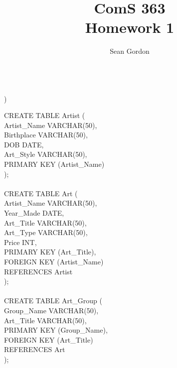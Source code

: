 \documentclass[12pt]{article}
\title{ComS 363\\Homework 1}
\author{Sean Gordon}
\newenvironment{PTMono}{\fontfamily{PTMono-TLF}\selectfont}{\par}
\begin{document}
\maketitle


\hrulefill \\



)

\begin{multicols}{2}
\begin{PTMono} \footnotesize

\noindent CREATE TABLE Artist (\\
\indent Artist\_Name VARCHAR(50),\\
\indent   Birthplace VARCHAR(50),\\
\indent   DOB DATE,\\
\indent   Art\_Style VARCHAR(50),\\
  
 PRIMARY KEY (Artist\_Name)\\
);\\\\



\noindent CREATE TABLE Art (\\
\indent   Artist\_Name VARCHAR(50),\\
\indent   Year\_Made DATE,\\
\indent   Art\_Title VARCHAR(50),\\
\indent   Art\_Type VARCHAR(50),\\
\indent   Price INT,\\
  
 PRIMARY KEY (Art\_Title),\\
\indent   FOREIGN KEY (Artist\_Name) \\
\indent \indent  REFERENCES Artist\\
);\\\\



\noindent CREATE TABLE Art\_Group (\\
\indent Group\_Name VARCHAR(50),\\
\indent  Art\_Title VARCHAR(50),\\
  
 PRIMARY KEY (Group\_Name),\\
\indent  FOREIGN KEY (Art\_Title) \\
  \indent \indent REFERENCES Art\\
);\\



\end{PTMono}
\end{multicols}
\end{document}
